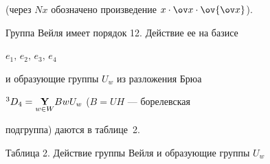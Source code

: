 (через $Nx$ обозначено произведение $x\cdot\ov x\cdot\ov{\ov x}$). 


 


Группа Вейля имеет порядок 12. Действие ее на базисе 


$e_1,\,e_2,\,e_3,\,e_4$ 


и образующие группы $U_w$ из разложения Брюа  


${}^3D_4=\underset{w\in W}{\bold Y}{}B w U_w$ ($B=UH$ --- борелевская 


подгруппа) даются в таблице~2. 


\pagebreak


 


\begin{center} 


Таблица 2. Действие группы Вейля и образующие группы $U_w$ 


\end{center} 


 


